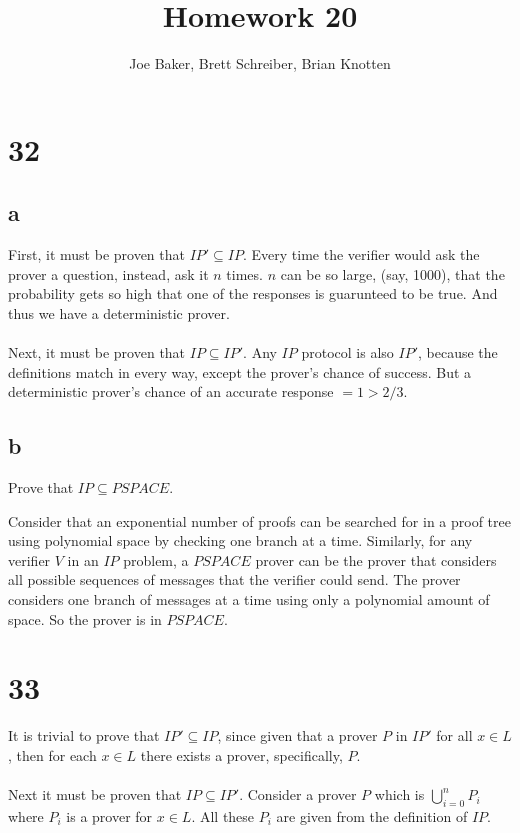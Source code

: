 \documentclass[letterpaper,notitlepage,twoside]{article}
\begin{document}
\title{Homework 20}
\author{Joe Baker, Brett Schreiber, Brian Knotten}
\maketitle

\section*{32}
\subsection*{a}
First, it must be proven that $IP' \subseteq IP$.
Every time the verifier would ask the prover a question, instead, ask it $n$ times. $n$ can be so large, (say, 1000), that the
probability gets so high that one of the responses is guarunteed to be true. And thus we have a deterministic prover. \\\\

Next, it must be proven that $IP \subseteq IP'$.
Any $IP$ protocol is also $IP'$, because the definitions match in every way, except the prover's chance of success.
But a deterministic prover's chance of an accurate response $= 1 > 2/3$.

\subsection*{b}
Prove that $IP \subseteq PSPACE$.

Consider that an exponential number of proofs can be searched for in a proof tree using polynomial space by checking one branch at a time. Similarly, for any verifier $V$ in an $IP$ problem, a $PSPACE$ prover can be the prover that considers all possible sequences of messages that the verifier could send. The prover considers one branch of messages at a time using only a polynomial amount of space. So the prover is in $PSPACE$.

\section*{33}
It is trivial to prove that $IP' \subseteq IP$, since given that a prover $P$ in $IP'$ for all $x \in L$, then for each $x \in L$ there exists a prover, specifically, $P$. \\\\

Next it must be proven that $IP \subseteq IP'$. Consider a prover $P$ which is $\bigcup_{i = 0}^n P_i$ where $P_i$ is a prover for $x \in L$. All these $P_i$ are given from the definition of $IP$. 
\end{document}
